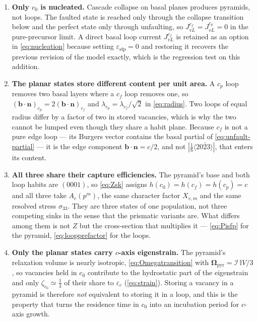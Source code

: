 \documentclass{article}
\newcommand{\bvec}{\bm b}
\newcommand{\nvec}{\bm n}
\begin{document}
\begin{enumerate}
\item \textbf{Only $c_0$ is nucleated.} Cascade collapse on basal planes produces
      pyramids, not loops. The faulted state is reached only through the collapse
      transition below and the perfect state only through unfaulting, so
      $J^{c_f}_{vL}=J^{c_p}_{vL}=0$ in the pure-precursor limit. A direct basal
      loop current $J^{c_f}_{vL}$ is retained as an option in
      \cref{eq:nucleation} because setting $\varepsilon_{\mathrm{sfp}}=0$ and
      restoring it recovers the previous revision of the model exactly, which is
      the regression test on this addition.
\item \textbf{The planar states store different content per unit area.} A $c_p$
      loop removes two basal layers where a $c_f$ loop removes one, so
      $(\bvec\!\cdot\!\nvec)_{c_p}=2(\bvec\!\cdot\!\nvec)_{c_f}$ and
      $\lambda_{c_p}=\lambda_{c_f}/\sqrt2$ in \cref{eq:radius}. Two loops of equal
      radius differ by a factor of two in stored vacancies, which is why the two
      cannot be lumped even though they share a habit plane. Because $c_f$ is not
      a pure edge loop --- its Burgers vector contains the basal partial of
      \cref{eq:unfault-partial} --- it is the edge component
      $\bvec\!\cdot\!\nvec=c/2$, and not $|\tfrac16\langle20\bar23\rangle|$, that
      enters its content.
\item \textbf{All three share their capture efficiencies.} The pyramid's base and
      both loop habits are $(0001)$, so \cref{eq:Zsk} assigns $h(c_0)=h(c_f)
      =h(c_p)=c$ and all three take $A_c(p^m)$, the same character factor
      $X_{v,m}$ and the same resolved stress $\sigma_{33}$. They are three states
      of one population, not three competing sinks in the sense that the
      prismatic variants are. What differs among them is not $Z$ but the
      cross-section that multiplies it --- \cref{eq:Pisfp} for the pyramid,
      \cref{eq:loopprefactor} for the loops.
\item \textbf{Only the planar states carry $c$-axis eigenstrain.} The pyramid's
      relaxation volume is nearly isotropic, \cref{eq:Omegatransition} with
      $\bm\Omega_{\mathrm{pyr}}=\mathcal I\,\mathbb I V/3$, so vacancies held in
      $c_0$ contribute to the hydrostatic part of the eigenstrain and only
      $\zeta_{c_0}\simeq\tfrac13$ of their share to $\varepsilon_c$
      (\cref{eq:strain}). Storing a vacancy in a pyramid is therefore \emph{not}
      equivalent to storing it in a loop, and this is the property that turns the
      residence time in $c_0$ into an incubation period for $c$-axis growth.
\end{enumerate}
\end{document}
